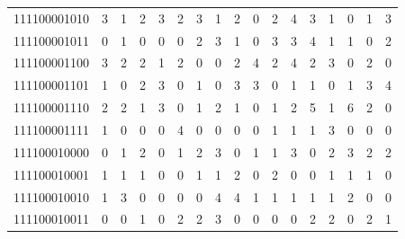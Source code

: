 \documentclass[10pt,a4paper]{article}
\begin{document}
\begin{longtable}{ |c|c|c|c|c|c|c|c|c|c|c|c|c|c|c|c|c| }
    111100001010              & 3                            & 1                                & 2                            & 3                              & 2   & 3   & 1   & 2   & 0   & 2   & 4   & 3   & 1   & 0   & 1   & 3   \\
    111100001011              & 0                            & 1                                & 0                            & 0                              & 0   & 2   & 3   & 1   & 0   & 3   & 3   & 4   & 1   & 1   & 0   & 2   \\
    111100001100              & 3                            & 2                                & 2                            & 1                              & 2   & 0   & 0   & 2   & 4   & 2   & 4   & 2   & 3   & 0   & 2   & 0   \\
    111100001101              & 1                            & 0                                & 2                            & 3                              & 0   & 1   & 0   & 3   & 3   & 0   & 1   & 1   & 0   & 1   & 3   & 4   \\
    111100001110              & 2                            & 2                                & 1                            & 3                              & 0   & 1   & 2   & 1   & 0   & 1   & 2   & 5   & 1   & 6   & 2   & 0   \\
    111100001111              & 1                            & 0                                & 0                            & 0                              & 4   & 0   & 0   & 0   & 0   & 1   & 1   & 1   & 3   & 0   & 0   & 0   \\
    111100010000              & 0                            & 1                                & 2                            & 0                              & 1   & 2   & 3   & 0   & 1   & 1   & 3   & 0   & 2   & 3   & 2   & 2   \\
    111100010001              & 1                            & 1                                & 1                            & 0                              & 0   & 1   & 1   & 2   & 0   & 2   & 0   & 0   & 1   & 1   & 1   & 0   \\
    111100010010              & 1                            & 3                                & 0                            & 0                              & 0   & 0   & 4   & 4   & 1   & 1   & 1   & 1   & 1   & 2   & 0   & 0   \\
    111100010011              & 0                            & 0                                & 1                            & 0                              & 2   & 2   & 3   & 0   & 0   & 0   & 0   & 2   & 2   & 0   & 2   & 1   \\

\end{longtable}
\end{document}
